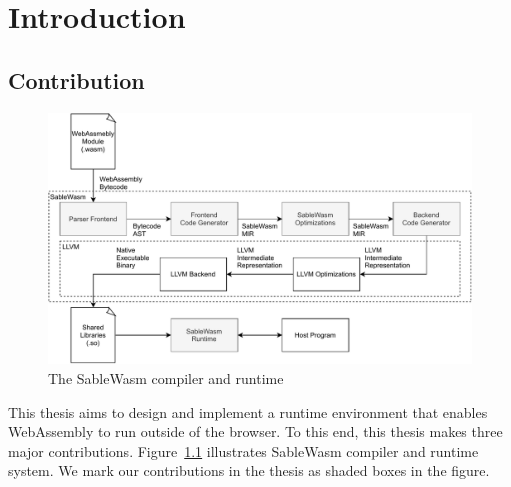 \chapter{Introduction}


\section*{Contribution}

\begin{figure}
    \centering
    \includegraphics[width=\textwidth]{Images/design}
    \caption{The SableWasm compiler and runtime}
    \label{fig:design}
\end{figure}

This thesis aims to design and implement a runtime environment that enables WebAssembly to run outside of the browser. To this end, this thesis makes three major contributions. Figure~\ref{fig:design} illustrates SableWasm compiler and runtime system. We mark our contributions in the thesis as shaded boxes in the figure.

